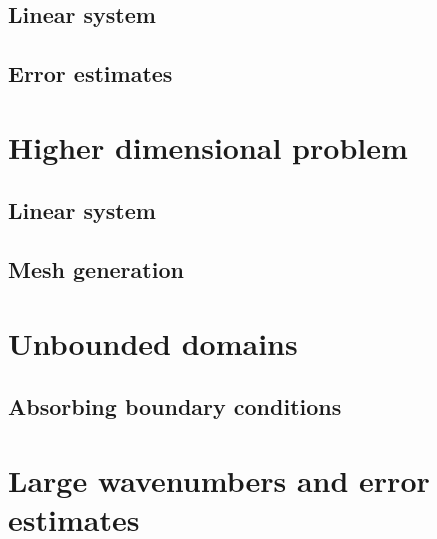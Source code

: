 \documentclass[a4paper]{article}
\begin{document}
\subsection{Linear system}

\subsection{Error estimates}


\section{Higher dimensional problem}

\subsection{Linear system}

\subsection{Mesh generation}


\section{Unbounded domains}

\subsection{Absorbing boundary conditions}


\section{Large wavenumbers and error estimates}
\end{document}
